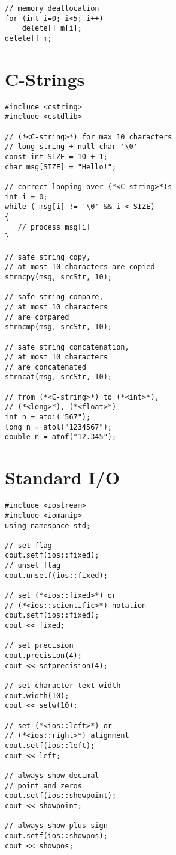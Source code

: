 \documentclass[10pt]{article}
\begin{document}
\begin{multicols*}{3}
\begin{lstlisting}
// memory deallocation
for (int i=0; i<5; i++)
    delete[] m[i];
delete[] m;
\end{lstlisting}
%
%
\section*{C-Strings}
\small
\lstset {language=C++}
\begin{lstlisting}
#include <cstring>
#include <cstdlib>

// (*<C-string>*) for max 10 characters
// long string + null char '\0'
const int SIZE = 10 + 1;
char msg[SIZE] = "Hello!";

// correct looping over (*<C-string>*)s
int i = 0;
while ( msg[i] != '\0' && i < SIZE)
{
   // process msg[i]
}

// safe string copy,
// at most 10 characters are copied
strncpy(msg, srcStr, 10);

// safe string compare,
// at most 10 characters
// are compared
strncmp(msg, srcStr, 10);

// safe string concatenation,
// at most 10 characters 
// are concatenated
strncat(msg, srcStr, 10);

// from (*<C-string>*) to (*<int>*),
// (*<long>*), (*<float>*)
int n = atoi("567");
long n = atol("1234567");
double n = atof("12.345");
\end{lstlisting}
%
%
\section*{Standard I/O}
\small
\lstset {language=C++}
\begin{lstlisting}
#include <iostream>
#include <iomanip>
using namespace std;

// set flag
cout.setf(ios::fixed);
// unset flag
cout.unsetf(ios::fixed);

// set (*<ios::fixed>*) or 
// (*<ios::scientific>*) notation
cout.setf(ios::fixed);
cout << fixed;

// set precision
cout.precision(4);
cout << setprecision(4);

// set character text width
cout.width(10);
cout << setw(10);

// set (*<ios::left>*) or
// (*<ios::right>*) alignment
cout.setf(ios::left);
cout << left;

// always show decimal
// point and zeros
cout.setf(ios::showpoint);
cout << showpoint;

// always show plus sign
cout.setf(ios::showpos);
cout << showpos;
\end{lstlisting}
%
%

\end{multicols*}
\end{document}

